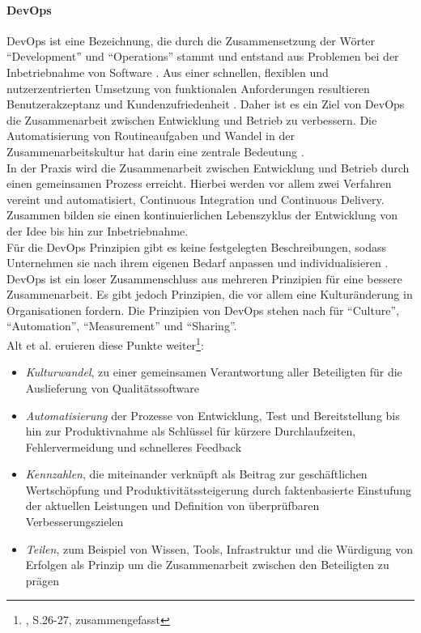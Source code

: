 \paragraph{DevOps}
DevOps ist eine Bezeichnung, die durch die Zusammensetzung der Wörter \enquote{Development} und \enquote{Operations} stammt und entstand aus Problemen bei der Inbetriebnahme von Software \cite{mci/Disterer2011}. Aus einer schnellen, flexiblen und nutzerzentrierten Umsetzung von funktionalen Anforderungen resultieren Benutzerakzeptanz und Kundenzufriedenheit \cite{mci/Disterer2011, Alt2017}. Daher ist es ein Ziel von DevOps die Zusammenarbeit zwischen Entwicklung und Betrieb zu verbessern. Die Automatisierung von Routineaufgaben und Wandel in der Zusammenarbeitskultur hat darin eine zentrale Bedeutung \cite{Alt2017}. 
\medskip
\\
In der Praxis wird die Zusammenarbeit zwischen Entwicklung und Betrieb durch einen gemeinsamen Prozess erreicht. Hierbei werden vor allem zwei Verfahren vereint und automatisiert, Continuous Integration und Continuous Delivery. Zusammen bilden sie einen kontinuierlichen Lebenszyklus der Entwicklung von der Idee bis hin zur Inbetriebnahme.
\medskip
\\
Für die DevOps Prinzipien gibt es keine festgelegten Beschreibungen, sodass Unternehmen sie nach ihrem eigenen Bedarf anpassen und individualisieren \cite{Alt2017}. DevOps ist ein loser Zusammenschluss aus mehreren Prinzipien für eine bessere Zusammenarbeit.
Es gibt jedoch Prinzipien, die vor allem eine Kulturänderung in Organisationen fordern. Die Prinzipien von DevOps stehen nach \citet{humble:2011} für \enquote{Culture}, \enquote{Automation}, \enquote{Measurement} und \enquote{Sharing}. 
\medskip
\\
Alt et al. \cite{Alt2017} eruieren diese Punkte weiter\footnote{\citet{Alt2017}, S.26-27, zusammengefasst}:
\begin{itemize}
    \item \emph{Kulturwandel}, zu einer gemeinsamen Verantwortung aller Beteiligten für die Auslieferung von Qualitätssoftware
    \item \emph{Automatisierung} der Prozesse von Entwicklung, Test und Bereitstellung bis hin zur Produktivnahme als Schlüssel für kürzere Durchlaufzeiten, Fehlervermeidung und schnelleres Feedback
    \item \emph{Kennzahlen}, die miteinander verknüpft als Beitrag zur geschäftlichen Wertschöpfung und Produktivitätssteigerung durch faktenbasierte Einstufung der aktuellen Leistungen und Definition von überprüfbaren Verbesserungszielen
    \item \emph{Teilen}, zum Beispiel von Wissen, Tools, Infrastruktur und die Würdigung von Erfolgen als Prinzip um die Zusammenarbeit zwischen den Beteiligten zu prägen
\end{itemize}

